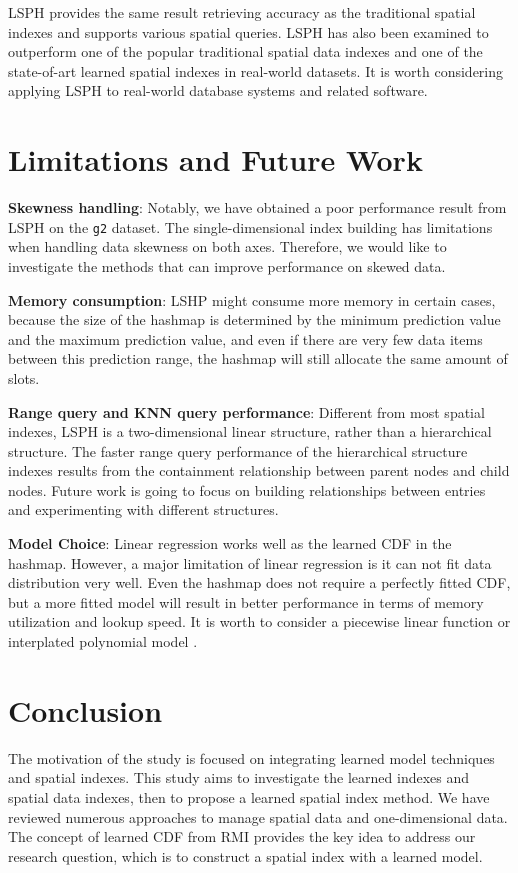 LSPH provides the same result retrieving accuracy as the traditional spatial indexes and supports various spatial queries. LSPH has also been examined to outperform one of the popular traditional spatial data indexes and one of the state-of-art learned spatial indexes in real-world datasets. It is worth considering applying LSPH to real-world database systems and related software. 


\section{Limitations and Future Work}
\textbf{Skewness handling}: Notably, we have obtained a poor performance result from LSPH on the \texttt{g2} dataset. The single-dimensional index building has limitations when handling data skewness on both axes. Therefore, we would like to investigate the methods that can improve performance on skewed data. 

\textbf{Memory consumption}: LSHP might consume more memory in certain cases, because the size of the hashmap is determined by the minimum prediction value and the maximum prediction value, and even if there are very few data items between this prediction range, the hashmap will still allocate the same amount of slots. 

\textbf{Range query and KNN query performance}: Different from most spatial indexes, LSPH is a two-dimensional linear structure, rather than a hierarchical structure. The faster range query performance of the hierarchical structure indexes results from the containment relationship between parent nodes and child nodes. Future work is going to focus on building relationships between entries and experimenting with different structures. 

\textbf{Model Choice}: Linear regression works well as the learned CDF in the hashmap. However, a major limitation of linear regression is it can not fit data distribution very well. Even the hashmap does not require a perfectly fitted CDF, but a more fitted model will result in better performance in terms of memory utilization and lookup speed. It is worth to consider a piecewise linear function or interplated polynomial model \cite{setiawan2020function}.

\section{Conclusion}
The motivation of the study is focused on integrating learned model techniques and spatial indexes. This study aims to investigate the learned indexes and spatial data indexes, then to propose a learned spatial index method. We have reviewed numerous approaches to manage spatial data and one-dimensional data. The concept of learned CDF from RMI provides the key idea to address our research question, which is to construct a spatial index with a learned model. 

